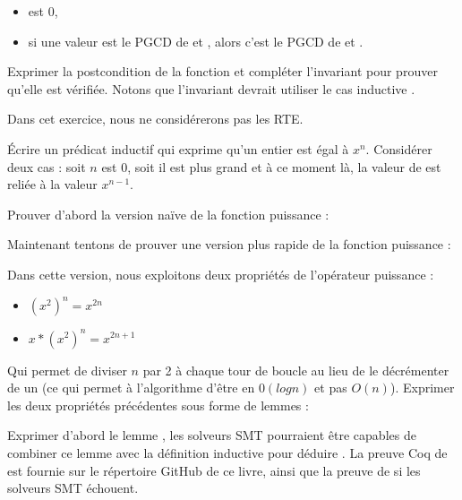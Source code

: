 \begin{itemize}
\item {} est 0,
\item si une valeur  est le PGCD de  et ,
      alors c'est le PGCD de  et .
\end{itemize}




Exprimer la postcondition de la fonction et compléter l'invariant pour prouver
qu'elle est vérifiée. Notons que l'invariant devrait utiliser le cas inductive
.





Dans cet exercice, nous ne considérerons pas les RTE.


Écrire un prédicat inductif qui exprime qu'un entier  est égal
à $x^n$. Considérer deux cas : soit $n$ est 0, soit il est plus grand et à ce moment
là, la valeur de  est reliée à la valeur $x^{n-1}$.




Prouver d'abord la version naïve de la fonction puissance :




Maintenant tentons de prouver une version plus rapide de la fonction puissance :




Dans cette version, nous exploitons deux propriétés de l'opérateur puissance :


\begin{itemize}
\item $(x^2)^n = x^{2n}$
\item $x * (x^2)^n = x^{2n+1}$
\end{itemize}


Qui permet de diviser $n$ par 2 à chaque tour de boucle au lieu de le décrémenter
de un (ce qui permet à l'algorithme d'être en $0(log n)$ et pas $O(n)$). Exprimer
les deux propriétés précédentes sous forme de lemmes :




Exprimer d'abord le lemme , les solveurs SMT pourraient
être capables de combiner ce lemme avec la définition inductive pour déduire
. La preuve Coq de  est fournie
sur le répertoire GitHub de ce livre, ainsi que la preuve de 
si les solveurs SMT échouent.


